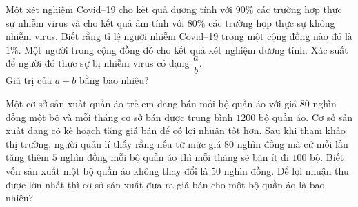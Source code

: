 \begin{ex}
	Một xét nghiệm Covid--19 cho kết quả dương tính với $90\%$ các trường hợp thực sự nhiễm virus và cho kết quả âm tính với $80\%$ các trường hợp thực sự không nhiễm virus. Biết rằng tỉ lệ người nhiễm Covid--19 trong một cộng đồng nào đó là $1\%$. Một người trong cộng đồng đó cho kết quả xét nghiệm dương tính. Xác suất để người đó thực sự bị nhiễm virus có dạng $\dfrac{a}{b}$.  \\
	Giá trị của $a+b$ bằng bao nhiêu?
\end{ex}

\begin{ex}
	Một cơ sở sản xuất quần áo trẻ em đang bán mỗi bộ quần áo với giá $80$ nghìn đồng một bộ và mỗi tháng cơ sở bán được trung bình $1200$ bộ quần áo. Cơ sở sản xuất đang có kế hoạch tăng giá bán để có lợi nhuận tốt hơn. Sau khi tham khảo thị trường, người quản lí thấy rằng nếu từ mức giá $80$ nghìn đồng mà cứ mỗi lần tăng thêm $5$ nghìn đồng mỗi bộ quần áo thì mỗi tháng sẽ bán ít đi $100$ bộ. Biết vốn sản xuất một bộ quần áo không thay đổi là $50$ nghìn đồng. Để lợi nhuận thu được lớn nhất thì cơ sở sản xuất đưa ra giá bán cho một bộ quần áo là bao nhiêu?
\end{ex}

